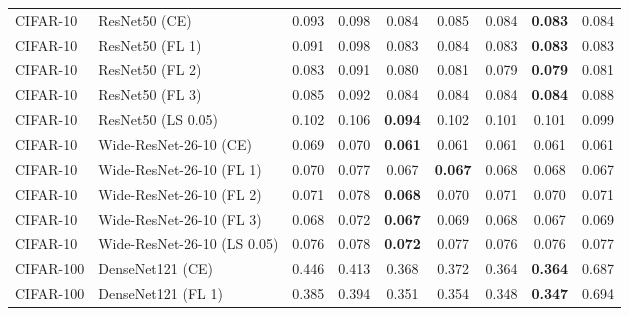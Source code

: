 \begin{table}[h!]
{\begin{tabular}{llccccccc}
    CIFAR-10 &               ResNet50 (CE) &         0.093 &        0.098 &                  0.084 &                  0.085 &                  0.084 & \textbf{0.083} &                  0.084 \\
    CIFAR-10 &             ResNet50 (FL 1) &         0.091 &        0.098 &                  0.083 &                  0.084 &                  0.083 & \textbf{0.083} &                  0.083 \\
    CIFAR-10 &             ResNet50 (FL 2) &         0.083 &        0.091 &                  0.080 &                  0.081 &                  0.079 & \textbf{0.079} &                  0.081 \\
    CIFAR-10 &             ResNet50 (FL 3) &         0.085 &        0.092 &                  0.084 &                  0.084 &                  0.084 & \textbf{0.084} &                  0.088 \\
    CIFAR-10 &          ResNet50 (LS 0.05) &         0.102 &        0.106 & \textbf{0.094} &                  0.102 &                  0.101 &                  0.101 &                  0.099 \\
    CIFAR-10 &      Wide-ResNet-26-10 (CE) &         0.069 &        0.070 & \textbf{0.061} &                  0.061 &                  0.061 &                  0.061 &                  0.061 \\
    CIFAR-10 &    Wide-ResNet-26-10 (FL 1) &         0.070 &        0.077 &                  0.067 & \textbf{0.067} &                  0.068 &                  0.068 &                  0.067 \\
    CIFAR-10 &    Wide-ResNet-26-10 (FL 2) &         0.071 &        0.078 & \textbf{0.068} &                  0.070 &                  0.071 &                  0.070 &                  0.071 \\
    CIFAR-10 &    Wide-ResNet-26-10 (FL 3) &         0.068 &        0.072 & \textbf{0.067} &                  0.069 &                  0.068 &                  0.067 &                  0.069 \\
    CIFAR-10 & Wide-ResNet-26-10 (LS 0.05) &         0.076 &        0.078 & \textbf{0.072} &                  0.077 &                  0.076 &                  0.076 &                  0.077 \\
   CIFAR-100 &            DenseNet121 (CE) &         0.446 &        0.413 &                  0.368 &                  0.372 &                  0.364 & \textbf{0.364} &                  0.687 \\
   CIFAR-100 &          DenseNet121 (FL 1) &         0.385 &        0.394 &                  0.351 &                  0.354 &                  0.348 & \textbf{0.347} &                  0.694 \\

\end{tabular}}
\end{table}
